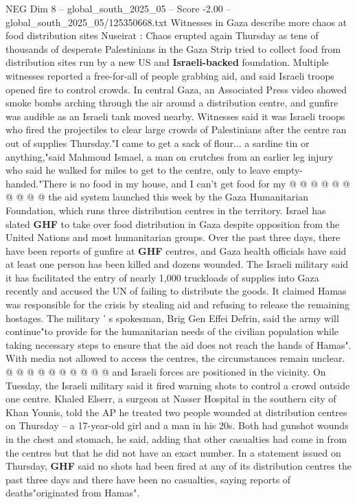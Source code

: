 \begin{textsample}{NEG Dim 8 – global\_south\_2025\_05 – Score -2.00 – global\_south\_2025\_05/125350668.txt}  \label{ex:f8_neg_006}
Witnesses in Gaza describe more chaos at food distribution sites Nuseirat : Chaos erupted again Thursday as tens of thousands of desperate Palestinians in the Gaza Strip tried to collect food from distribution sites run by a new US and \textbf{Israeli-backed} foundation.
Multiple witnesses reported a free-for-all of people grabbing aid, and said Israeli troops opened fire to control crowds.
In central Gaza, an Associated Press video showed smoke bombs arching through the air around a distribution centre, and gunfire was audible as an Israeli tank moved nearby.
Witnesses said it was Israeli troops who fired the projectiles to clear large crowds of Palestinians after the centre ran out of supplies Thursday."I came to get a sack of flour... a sardine tin or anything,"said Mahmoud Ismael, a man on crutches from an earlier leg injury who said he walked for miles to get to the centre, only to leave empty-handed."There is no food in my house, and I can't get food for my @ @ @ @ @ @ @ @ @ @ the aid system launched this week by the Gaza Humanitarian Foundation, which runs three distribution centres in the territory.
Israel has slated \textbf{GHF} to take over food distribution in Gaza despite opposition from the United Nations and most humanitarian groups.
Over the past three days, there have been reports of gunfire at \textbf{GHF} centres, and Gaza health officials have said at least one person has been killed and dozens wounded.
The Israeli military said it has facilitated the entry of nearly 1,000 truckloads of supplies into Gaza recently and accused the UN of failing to distribute the goods.
It claimed Hamas was responsible for the crisis by stealing aid and refusing to release the remaining hostages.
The military ' s spokesman, Brig Gen Effei Defrin, said the army will continue"to provide for the humanitarian needs of the civilian population while taking necessary steps to ensure that the aid does not reach the hands of Hamas".
With media not allowed to access the centres, the circumstances remain unclear. @ @ @ @ @ @ @ @ @ @ and Israeli forces are positioned in the vicinity.
On Tuesday, the Israeli military said it fired warning shots to control a crowd outside one centre.
Khaled Elserr, a surgeon at Nasser Hospital in the southern city of Khan Younis, told the AP he treated two people wounded at distribution centres on Thursday -- a 17-year-old girl and a man in his 20s.
Both had gunshot wounds in the chest and stomach, he said, adding that other casualties had come in from the centres but that he did not have an exact number.
In a statement issued on Thursday, \textbf{GHF} said no shots had been fired at any of its distribution centres the past three days and there have been no casualties, saying reports of deaths"originated from Hamas".

\end{textsample}
